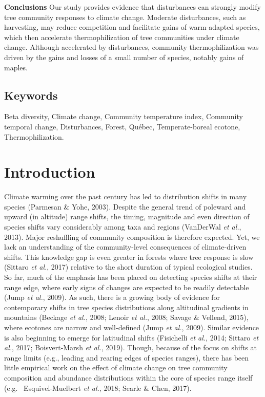 \documentclass[a4paperpaper,]{article}
\begin{document}
\textbf{Conclusions} Our study provides evidence that disturbances can
strongly modify tree community responses to climate change. Moderate
disturbances, such as harvesting, may reduce competition and facilitate
gains of warm-adapted species, which then accelerate thermophilization
of tree communities under climate change. Although accelerated by
disturbances, community thermophilization was driven by the gains and
losses of a small number of species, notably gains of maples.

\hypertarget{keywords}{%
\subsection{Keywords}\label{keywords}}

Beta diversity, Climate change, Community temperature index, Community
temporal change, Disturbances, Forest, Québec, Temperate-boreal ecotone,
Thermophilization.

\pagebreak

\hypertarget{introduction}{%
\section{Introduction}\label{introduction}}

Climate warming over the past century has led to distribution shifts in
many species (Parmesan \& Yohe, 2003). Despite the general trend of
poleward and upward (in altitude) range shifts, the timing, magnitude
and even direction of species shifts vary considerably among taxa and
regions (VanDerWal \emph{et al.}, 2013). Major reshuffling of community
composition is therefore expected. Yet, we lack an understanding of the
community-level consequences of climate-driven shifts. This knowledge
gap is even greater in forests where tree response is slow (Sittaro
\emph{et al.}, 2017) relative to the short duration of typical
ecological studies. So far, much of the emphasis has been placed on
detecting species shifts at their range edge, where early signs of
changes are expected to be readily detectable (Jump \emph{et al.},
2009). As such, there is a growing body of evidence for contemporary
shifts in tree species distributions along altitudinal gradients in
mountains (Beckage \emph{et al.}, 2008; Lenoir \emph{et al.}, 2008;
Savage \& Vellend, 2015), where ecotones are narrow and well-defined
(Jump \emph{et al.}, 2009). Similar evidence is also beginning to emerge
for latitudinal shifts (Fisichelli \emph{et al.}, 2014; Sittaro \emph{et
al.}, 2017; Boisvert‐Marsh \emph{et al.}, 2019). Though, because of the
focus on shifts at range limits (e.g., leading and rearing edges of
species ranges), there has been little empirical work on the effect of
climate change on tree community composition and abundance distributions
within the core of species range itself (e.g.~ Esquivel-Muelbert
\emph{et al.}, 2018; Searle \& Chen, 2017).
\end{document}
